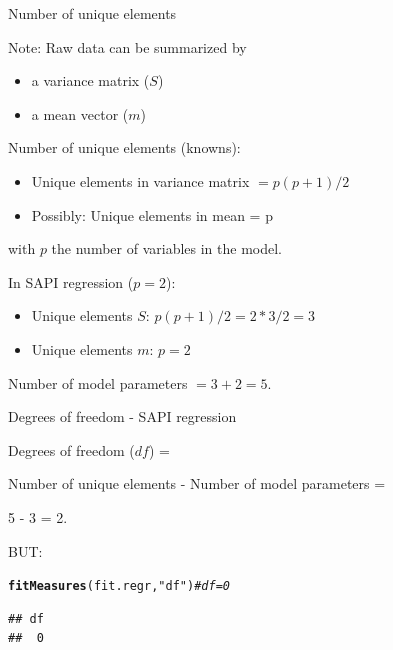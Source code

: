 \documentclass[10pt]{beamer}\usepackage[]{graphicx}\usepackage[]{xcolor}
\makeatletter
\newcommand{\hlstr}[1]{\textcolor[rgb]{0.192,0.494,0.8}{#1}}%
\newcommand{\hlcom}[1]{\textcolor[rgb]{0.678,0.584,0.686}{\textit{#1}}}%
\newcommand{\hlstd}[1]{\textcolor[rgb]{0.345,0.345,0.345}{#1}}%
\newcommand{\hlkwd}[1]{\textcolor[rgb]{0.737,0.353,0.396}{\textbf{#1}}}%
\newenvironment{kframe}{%
 \def\at@end@of@kframe{}%
 \ifinner\ifhmode%
  \def\at@end@of@kframe{\end{minipage}}%
  \begin{minipage}{\columnwidth}%
 \fi\fi%
 \def\FrameCommand##1{\hskip\@totalleftmargin \hskip-\fboxsep
 \colorbox{shadecolor}{##1}\hskip-\fboxsep
     \hskip-\linewidth \hskip-\@totalleftmargin \hskip\columnwidth}%
 \MakeFramed {\advance\hsize-\width
   \@totalleftmargin\z@ \linewidth\hsize
   \@setminipage}}%
 {\par\unskip\endMakeFramed%
 \at@end@of@kframe}
\newenvironment{knitrout}{}{} %
\makeatother
\begin{document}
%
\begin{frame}{Number of unique elements}

Note: Raw data can be summarized by
\begin{itemize}
\item{a variance matrix ($S$)}
\item{a mean vector ($m$)}
\end{itemize}

\vspace{5mm}

Number of unique elements (knowns):
\begin{itemize}
\item{Unique elements in variance matrix $= p(p+1)/2$}
\item{Possibly: Unique elements in mean = p}
\end{itemize}
with $p$ the number of variables in the model.

\vspace{5mm}

In SAPI regression ($p = 2$):\\
\begin{itemize}
\item{Unique elements $S$: $p(p+1)/2 = 2*3/2 = 3$}
\item{Unique elements $m$: $p = 2$}
\end{itemize}
Number of model parameters $= 3+2 = 5$. 

\end{frame}
%
\begin{frame}[fragile]{Degrees of freedom - SAPI regression}

Degrees of freedom ($df$) = 

\vspace{5mm}

Number of unique elements - Number of model parameters = 

\vspace{5mm}

5 - 3 = 2.

\vspace{5mm}

BUT:\\
\begin{knitrout}
\color{fgcolor}\begin{kframe}
\begin{alltt}
\hlkwd{fitMeasures}\hlstd{(fit.regr,} \hlstr{"df"}\hlstd{)} \hlcom{# df = 0}
\end{alltt}
\begin{verbatim}
## df 
##  0
\end{verbatim}
\end{kframe}
\end{knitrout}

\end{frame}
\end{document}
